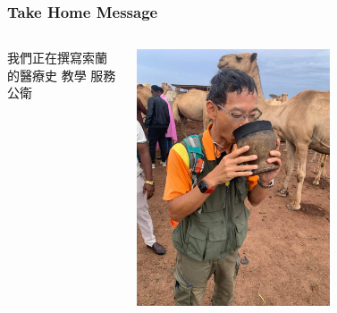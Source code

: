 \documentclass[aspectratio=169]{beamer}
\begin{document}
\begin{frame}
\frametitle{Take Home Message}
\begin{columns}
    


\begin{outline}
我們正在撰寫索蘭的醫療史
\1 教學
\1 服務
\1 公衛

\end{outline}

\includegraphics[width=0.6\textwidth]{IMG-0394.JPG}
\end{columns}
\end{frame}
\end{document}
